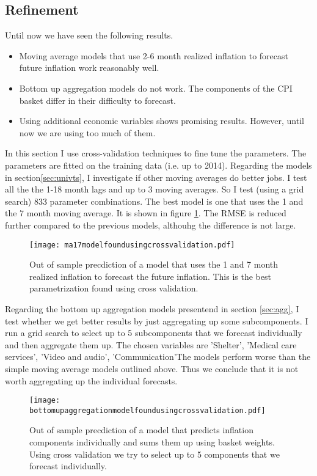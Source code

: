 \documentclass[12pt]{article}
\begin{document}
\subsection{Refinement}
\label{sec:Refinement}

Until now we have seen the following results. 
\begin{itemize}
\item Moving average models that use 2-6 month realized inflation to forecast future inflation work reasonably well.
\item Bottom up aggregation models do not work. The components of the CPI basket differ in their difficulty to forecast.
\item Using additional economic variables shows promising results. However, until now we are using too much of them.
\end{itemize}

In this section I use cross-validation techniques to fine tune the parameters. The parameters are fitted on the training data (i.e. up to 2014).
Regarding the models in section\ref{sec:univts}, I investigate if other moving averages do better jobs. I test all the the 1-18 month lags and up to 3 moving averages. So I test (using a grid search) 833 parameter combinations. The best model is one that uses the 1 and the 7 month moving average. It is shown in figure \ref{fig:ma17modelfoundusingcrossvalidation}. The RMSE is reduced further compared to the previous models, althouhg the difference is not large.
\begin{figure}[h]
    \centering
    \texttt{[image: ma17modelfoundusingcrossvalidation.pdf]}
    \caption{Out of sample precdiction of a model that uses the 1 and 7 month realized inflation to forecast the future inflation. This is the best parametrization found using cross validation.}
    \label{fig:ma17modelfoundusingcrossvalidation}
\end{figure}


Regarding the bottom up aggregation models presentend in section \ref{sec:agg}, I test whether we get better results by just aggregating up some subcomponents. I run a grid search to select up to 5 subcomponents that we forecast individually and then aggregate them up. The chosen variables are 'Shelter',  'Medical care services', 'Video and audio',
  'Communication'The models perform worse than the simple moving average models outlined above. Thus we conclude that it is not worth aggregating up the individual forecasts. 
\begin{figure}[h]
    \centering
    \texttt{[image: bottomupaggregationmodelfoundusingcrossvalidation.pdf]}
    \caption{Out of sample precdiction of a model that predicts inflation components individually and sums them up using basket weights. Using cross validation we try to select up to 5 components that we forecast individually. }
    \label{fig:bottomupaggregationmodelfoundusingcrossvalidation}
\end{figure}
\end{document}
